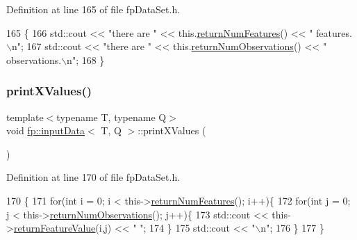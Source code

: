 Definition at line 165 of file fp\+Data\+Set.\+h.


\begin{DoxyCode}
165                              \{
166             std::cout << \textcolor{stringliteral}{"there are "} << this.\hyperlink{classfp_1_1inputData_ae9362286ea7706a8b0d91ba96e9ad478}{returnNumFeatures}() << \textcolor{stringliteral}{" features.\(\backslash\)n"};
167             std::cout << \textcolor{stringliteral}{"there are "} << this.\hyperlink{classfp_1_1inputData_af7dc02941195e025d1d89c882096027d}{returnNumObservations}() << \textcolor{stringliteral}{"
       observations.\(\backslash\)n"};
168         \}
\end{DoxyCode}
\mbox{\label{classfp_1_1inputData_aad488107f77249e42b75b66a4aea49f1}} 
\subsubsection{\texorpdfstring{print\+X\+Values()}{printXValues()}}
{\footnotesize\ttfamily template$<$typename T, typename Q$>$ \\
void \hyperlink{classfp_1_1inputData}{fp\+::input\+Data}$<$ T, Q $>$\+::print\+X\+Values (\begin{DoxyParamCaption}{ }\end{DoxyParamCaption})\hspace{0.3cm}{\ttfamily [inline]}}



Definition at line 170 of file fp\+Data\+Set.\+h.


\begin{DoxyCode}
170                            \{
171             \textcolor{keywordflow}{for}(\textcolor{keywordtype}{int} i = 0; i < this->\hyperlink{classfp_1_1inputData_ae9362286ea7706a8b0d91ba96e9ad478}{returnNumFeatures}(); i++)\{
172                 \textcolor{keywordflow}{for}(\textcolor{keywordtype}{int} j = 0; j < this->\hyperlink{classfp_1_1inputData_af7dc02941195e025d1d89c882096027d}{returnNumObservations}(); j++)\{
173                     std::cout << this->\hyperlink{classfp_1_1inputData_af52ac3512ee8f6e973799e024ddbf629}{returnFeatureValue}(i,j) << \textcolor{stringliteral}{" "};
174                 \}
175                 std::cout << \textcolor{stringliteral}{"\(\backslash\)n"};
176             \}
177         \}
\end{DoxyCode}
\mbox{\label{classfp_1_1inputData_aa529afe056caade620ad93f9494980c6}} 
